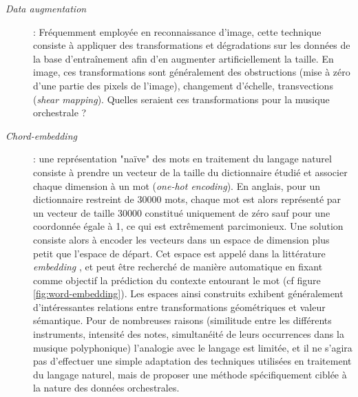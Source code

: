 \documentclass[a4paper, 10pt]{article} %
\begin{document}
\begin{description}
\item[\textit{Data augmentation}] : Fréquemment employée en reconnaissance d'image, cette technique consiste à appliquer des transformations et dégradations sur les données de la base d'entraînement afin d'en augmenter artificiellement la taille. En image, ces transformations sont généralement des obstructions (mise à zéro d'une partie des pixels de l'image), changement d'échelle, transvections (\textit{shear mapping}). Quelles seraient ces transformations pour la musique orchestrale ? 
\item[\textit{Chord-embedding}] : une représentation "naïve" des mots en traitement du langage naturel consiste à prendre un vecteur de la taille du dictionnaire étudié et associer chaque dimension à un mot (\textit{one-hot encoding}). En anglais, pour un dictionnaire restreint de 30000 mots, chaque mot est alors représenté par un vecteur de taille 30000 constitué uniquement de zéro sauf pour une coordonnée égale à 1, ce qui est extrêmement parcimonieux. Une solution consiste alors à encoder les vecteurs dans un espace de dimension plus petit que l'espace de départ. Cet espace est appelé dans la littérature \textit{embedding} \cite{mikolov2013distributed}, et peut être recherché de manière automatique en fixant comme objectif la prédiction du contexte entourant le mot (cf figure \ref{fig:word-embedding}). Les espaces ainsi construits exhibent généralement d'intéressantes relations entre transformations géométriques et valeur sémantique. Pour de nombreuses raisons (similitude entre les différents instruments, intensité des notes, simultanéité de leurs occurrences dans la musique polyphonique) l'analogie avec le langage est limitée, et il ne s'agira pas d'effectuer une simple adaptation des techniques utilisées en traitement du langage naturel, mais de proposer une méthode spécifiquement ciblée à la nature des données orchestrales.
\end{description}
\end{document}
